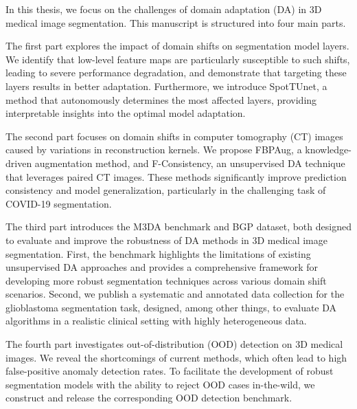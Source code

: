 In this thesis, we focus on the challenges of domain adaptation (DA) in 3D medical image segmentation. This manuscript is structured into four main parts.

The first part explores the impact of domain shifts on segmentation model layers. We identify that low-level feature maps are particularly susceptible to such shifts, leading to severe performance degradation, and demonstrate that targeting these layers results in better adaptation. Furthermore, we introduce SpotTUnet, a method that autonomously determines the most affected layers, providing interpretable insights into the optimal model adaptation.

The second part focuses on domain shifts in computer tomography (CT) images caused by variations in reconstruction kernels. We propose FBPAug, a knowledge-driven augmentation method, and F-Consistency, an unsupervised DA technique that leverages paired CT images. These methods significantly improve prediction consistency and model generalization, particularly in the challenging task of COVID-19 segmentation.

The third part introduces the M3DA benchmark and BGP dataset, both designed to evaluate and improve the robustness of DA methods in 3D medical image segmentation. First, the benchmark highlights the limitations of existing unsupervised DA approaches and provides a comprehensive framework for developing more robust segmentation techniques across various domain shift scenarios. Second, we publish a systematic and annotated data collection for the glioblastoma segmentation task, designed, among other things, to evaluate DA algorithms in a realistic clinical setting with highly heterogeneous data.

The fourth part investigates out-of-distribution (OOD) detection on 3D medical images. We reveal the shortcomings of current methods, which often lead to high false-positive anomaly detection rates. To facilitate the development of robust segmentation models with the ability to reject OOD cases in-the-wild, we construct and release the corresponding OOD detection benchmark.
